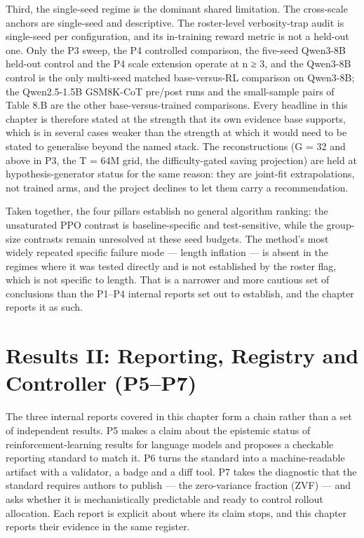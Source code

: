 \documentclass[12pt,a4paper]{report}
\begin{document}
Third, the single-seed regime is the dominant shared limitation. The
cross-scale anchors are single-seed and descriptive. The roster-level
verbosity-trap audit is single-seed per configuration, and its
in-training reward metric is not a held-out one. Only the P3 sweep, the
P4 controlled comparison, the five-seed Qwen3-8B held-out control and
the P4 scale extension operate at n ≥ 3, and the Qwen3-8B control is the
only multi-seed matched base-versus-RL comparison on Qwen3-8B; the
Qwen2.5-1.5B GSM8K-CoT pre/post runs and the small-sample pairs of Table
8.B are the other base-versus-trained comparisons. Every headline in
this chapter is therefore stated at the strength that its own evidence
base supports, which is in several cases weaker than the strength at
which it would need to be stated to generalise beyond the named stack.
The reconstructions (G = 32 and above in P3, the T = 64M grid, the
difficulty-gated saving projection) are held at hypothesis-generator
status for the same reason: they are joint-fit extrapolations, not
trained arms, and the project declines to let them carry a
recommendation.

Taken together, the four pillars establish no general algorithm ranking:
the unsaturated PPO contrast is baseline-specific and test-sensitive,
while the group-size contrasts remain unresolved at these seed budgets.
The method's most widely repeated specific failure mode --- length
inflation --- is absent in the regimes where it was tested directly and
is not established by the roster flag, which is not specific to length.
That is a narrower and more cautious set of conclusions than the P1--P4
internal reports set out to establish, and the chapter reports it as
such.



\chapter{Results II: Reporting, Registry and Controller
(P5--P7)}\label{results-ii-reporting-registry-and-controller-p5p7}

The three internal reports covered in this chapter form a chain rather
than a set of independent results. P5 makes a claim about the epistemic
status of reinforcement-learning results for language models and
proposes a checkable reporting standard to match it. P6 turns the
standard into a machine-readable artifact with a validator, a badge and
a diff tool. P7 takes the diagnostic that the standard requires authors
to publish --- the zero-variance fraction (ZVF) --- and asks whether it
is mechanistically predictable and ready to control rollout allocation.
Each report is explicit about where its claim stops, and this chapter
reports their evidence in the same register.
\end{document}
